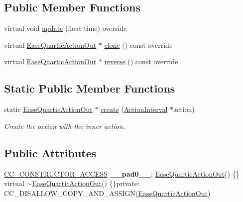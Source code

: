 \subsection*{Public Member Functions}
\begin{DoxyCompactItemize}
\item 
virtual void \hyperlink{classEaseQuarticActionOut_a00d0cdbad4cb7d38c9655780f2034a97}{update} (float time) override
\item 
virtual \hyperlink{classEaseQuarticActionOut}{Ease\+Quartic\+Action\+Out} $\ast$ \hyperlink{classEaseQuarticActionOut_a0d29354269fc9a975fe64ff915bced49}{clone} () const override
\item 
virtual \hyperlink{classEaseQuarticActionOut}{Ease\+Quartic\+Action\+Out} $\ast$ \hyperlink{classEaseQuarticActionOut_a0826d867637edc85123861ebac4b7a84}{reverse} () const override
\end{DoxyCompactItemize}
\subsection*{Static Public Member Functions}
\begin{DoxyCompactItemize}
\item 
static \hyperlink{classEaseQuarticActionOut}{Ease\+Quartic\+Action\+Out} $\ast$ \hyperlink{classEaseQuarticActionOut_a9ac4e42e6cf887aeb1f2d29ec386d288}{create} (\hyperlink{classActionInterval}{Action\+Interval} $\ast$action)
\begin{DoxyCompactList}\small\item\em Create the action with the inner action. \end{DoxyCompactList}\end{DoxyCompactItemize}
\subsection*{Public Attributes}
\begin{DoxyCompactItemize}
\item 
\mbox{\label{classEaseQuarticActionOut_a1fc6914d1a23ad51bc3c19e689d15f65}} 
\hyperlink{_2cocos2d_2cocos_2base_2ccConfig_8h_a25ef1314f97c35a2ed3d029b0ead6da0}{C\+C\+\_\+\+C\+O\+N\+S\+T\+R\+U\+C\+T\+O\+R\+\_\+\+A\+C\+C\+E\+SS} {\bfseries \+\_\+\+\_\+pad0\+\_\+\+\_\+}\+: \hyperlink{classEaseQuarticActionOut}{Ease\+Quartic\+Action\+Out}() \{\} virtual $\sim$\hyperlink{classEaseQuarticActionOut}{Ease\+Quartic\+Action\+Out}() \{\}private\+: C\+C\+\_\+\+D\+I\+S\+A\+L\+L\+O\+W\+\_\+\+C\+O\+P\+Y\+\_\+\+A\+N\+D\+\_\+\+A\+S\+S\+I\+GN(\hyperlink{classEaseQuarticActionOut}{Ease\+Quartic\+Action\+Out})
\end{DoxyCompactItemize}
